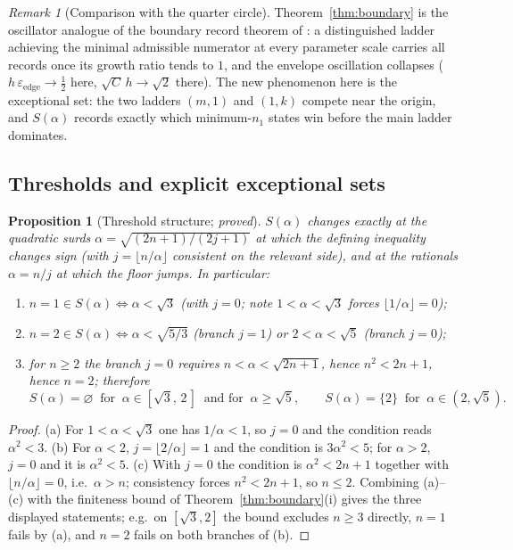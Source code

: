 \documentclass[11pt]{article}
\newtheorem{proposition}[theorem]{Proposition}
\theoremstyle{definition}
\theoremstyle{remark}
\newtheorem{remark}[theorem]{Remark}
\newcommand{\ee}{\varepsilon_{\mathrm{edge}}}
\begin{document}
\begin{remark}[Comparison with the quarter circle]
Theorem~\ref{thm:boundary} is the oscillator analogue of the boundary record theorem of \cite[Thm.~1.4]{quartercircle}: a distinguished ladder achieving the minimal admissible numerator at every parameter scale carries all records once its growth ratio tends to $1$, and the envelope oscillation collapses ($h\,\ee\to\tfrac12$ here, $\sqrt C\,h\to\sqrt2$ there). The new phenomenon here is the exceptional set: the two ladders $(m,1)$ and $(1,k)$ compete near the origin, and $S(\alpha)$ records exactly which minimum-$n_1$ states win before the main ladder dominates.
\end{remark}

\subsection{Thresholds and explicit exceptional sets}\label{sec:thresholds}

\begin{proposition}[Threshold structure; \emph{proved}]\label{prop:thresholds}
$S(\alpha)$ changes exactly at the quadratic surds $\alpha=\sqrt{(2n+1)/(2j+1)}$ at which the defining inequality changes sign (with $j=\lfloor n/\alpha\rfloor$ consistent on the relevant side), and at the rationals $\alpha=n/j$ at which the floor jumps. In particular:
\begin{enumerate}
\item[(a)] $n=1\in S(\alpha)\iff \alpha<\sqrt3$ (with $j=0$; note $1<\alpha<\sqrt3$ forces $\lfloor 1/\alpha\rfloor=0$);
\item[(b)] $n=2\in S(\alpha)\iff \alpha<\sqrt{5/3}$ (branch $j=1$) or $2<\alpha<\sqrt5$ (branch $j=0$);
\item[(c)] for $n\ge2$ the branch $j=0$ requires $n<\alpha<\sqrt{2n+1}$, hence $n^2<2n+1$, hence $n=2$; therefore
\[
S(\alpha)=\varnothing \ \text{ for }\ \alpha\in[\sqrt3,\,2\,]\ \text{ and for }\ \alpha\ge\sqrt5,
\qquad
S(\alpha)=\{2\}\ \text{ for }\ \alpha\in(2,\sqrt5).
\]
\end{enumerate}
\end{proposition}

\begin{proof}
(a) For $1<\alpha<\sqrt3$ one has $1/\alpha<1$, so $j=0$ and the condition reads $\alpha^2<3$. (b) For $\alpha<2$, $j=\lfloor2/\alpha\rfloor=1$ and the condition is $3\alpha^2<5$; for $\alpha>2$, $j=0$ and it is $\alpha^2<5$. (c) With $j=0$ the condition is $\alpha^2<2n+1$ together with $\lfloor n/\alpha\rfloor=0$, i.e.\ $\alpha>n$; consistency forces $n^2<2n+1$, so $n\le2$. Combining (a)--(c) with the finiteness bound of Theorem~\ref{thm:boundary}(i) gives the three displayed statements; e.g.\ on $[\sqrt3,2]$ the bound excludes $n\ge3$ directly, $n=1$ fails by (a), and $n=2$ fails on both branches of (b).
\end{proof}
\end{document}
